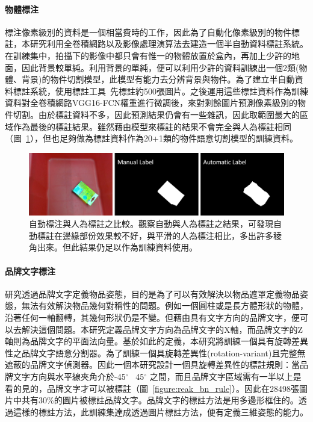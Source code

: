 \paragraph{物體標注}
標注像素級別的資料是一個相當費時的工作，因此為了自動化像素級別的物件標註，本研究利用全卷積網路以及影像處理演算法去建造一個半自動資料標註系統。在訓練集中，拍攝下的影像中都只會有惟一的物體放置於盒內，再加上少許的地面，因此背景較單純。利用背景的單純，便可以利用少許的資料訓練出一個2類(物體、背景)的物件切割模型，此模型有能力去分辨背景與物件。為了建立半自動資料標註系統，使用標註工具~\cite{russell2008labelme}先標註約500張圖片。之後運用這些標註資料作為訓練資料對全卷積網路VGG16-FCN權重進行微調後，來對剩餘圖片預測像素級別的物件切割。由於標註資料不多，因此預測結果仍會有一些雜訊，因此取範圍最大的區域作為最後的標註結果。雖然藉由模型來標註的結果不會完全與人為標註相同（圖~\ref{figure:auto_object_label}），但也足夠做為標註資料作為20+1類的物件語意切割模型的訓練資料。

\begin{figure}[ht]
	\centering
	\includegraphics[height=!, width=1.0\linewidth, keepaspectratio=true]
	{./figures/auto_object_label.png}
  \caption{自動標注與人為標註之比較。觀察自動與人為標註之結果，可發現自動標註在邊緣部份效果較不好，與平滑的人為標注相比，多出許多稜角出來。但此結果仍足以作為訓練資料使用。}
  \label{figure:auto_object_label}
\end{figure}


\paragraph{品牌文字標注}
研究透過品牌文字定義物品姿態，目的是為了可以有效解決以物品遮罩定義物品姿態，無法有效解決物品幾何對稱性的問題。例如一個圓柱或是長方體形狀的物體，沿著任何一軸翻轉，其幾何形狀仍是不變。但藉由具有文字方向的品牌文字，便可以去解決這個問題。本研究定義品牌文字方向為品牌文字的X軸，而品牌文字的Z軸則為品牌文字的平面法向量。基於如此的定義，本研究將訓練一個具有旋轉差異性之品牌文字語意分割器。為了訓練一個具旋轉差異性(rotation-variant)且完整無遮蔽的品牌文字偵測器。因此一個本研究設計一個具旋轉差異性的標註規則：當品牌文字方向與水平線夾角介於-45$^{\circ}$ ~45$^{\circ}$ 之間，而且品牌文字區域需有一半以上是看的見的，品牌文字才可以被標註（圖~\ref{figure:reak_bn_rule}）。因此在28498張圖片中共有30\%的圖片被標註品牌文字。品牌文字的標註方法是用多邊形框住的。透過這樣的標註方法，此訓練集達成透過圖片標註方法，便有定義三維姿態的能力。


